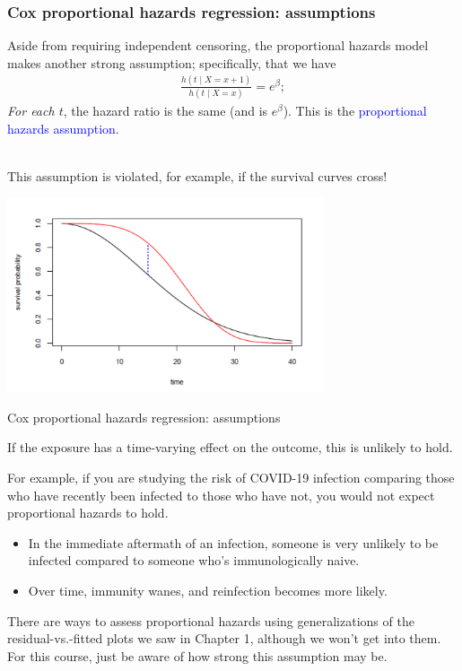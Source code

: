 \documentclass[10pt,t]{beamer}
\begin{document}
\begin{frame}
\frametitle{Cox proportional hazards regression: assumptions}
\vspace{-0.5cm}
Aside from requiring independent censoring, the proportional hazards model makes another strong assumption; specifically, that we have
\begin{align*}
\frac{h(t \mid X = x + 1)}{h(t \mid X = x)}=  e^{\beta};
\end{align*}
\textit{For each $t$}, the hazard ratio is the same (and is $e^{\beta}$). This is the \textcolor{blue}{proportional hazards assumption}.
\\ ~\ 

This assumption is violated, for example, if the survival curves cross! 
\begin{center}
	\includegraphics[width = 0.7\textwidth]{figs/crossing_hazards.png}
\end{center}
\end{frame}

\begin{frame}{Cox proportional hazards regression: assumptions}
	
	\vspace{-5 mm}
	
	If the exposure has a time-varying effect on the outcome, this is unlikely to hold. 
	
	\medskip
	
	For example, if you are studying the risk of COVID-19 infection comparing those who have recently been infected to those who have not, you would not expect proportional hazards to hold. 
	
	\medskip
	
	\begin{itemize}
		\item In the immediate aftermath of an infection, someone is very unlikely to be infected compared to someone who's immunologically naive. 
		
		\medskip
		
		\item Over time, immunity wanes, and reinfection becomes more likely. 
	\end{itemize}

\medskip
	There are ways to assess proportional hazards using generalizations of the residual-vs.-fitted plots we saw in Chapter 1, although we won't get into them. For this course, just be aware of how strong this assumption may be.
\end{frame}
\end{document}
